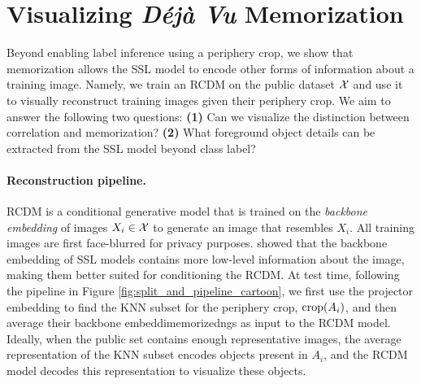 \section{Visualizing \emph{Déjà Vu} Memorization}
\label{sec:visualizing}
Beyond enabling label inference using a periphery crop, we show that \dejavu memorization allows the SSL model to encode other forms of information about a training image. Namely, we train an RCDM \citep{RCDM} on the public dataset $\mathcal{X}$ and use it to visually reconstruct training images given their periphery crop.
We aim to answer the following two questions: \textbf{(1)} Can we visualize the distinction between correlation and \dejavu memorization? \textbf{(2)} What foreground object details can be extracted from the SSL model beyond class label? 
\vspace{-0.5em}
\paragraph{Reconstruction pipeline.}
RCDM is a conditional generative model that is trained on the \emph{backbone embedding} of images $X_i \in \mathcal{X}$ to generate an image that resembles $X_i$. All training images are first face-blurred for privacy purposes. \citet{RCDM} showed that the backbone embedding of SSL models contains more low-level information about the image, making them better suited for conditioning the RCDM.
At test time, following the pipeline in Figure \ref{fig:split_and_pipeline_cartoon}, we first use the projector embedding to find the KNN subset for the periphery crop, $\mathrm{crop}({A_i})$, and then average their backbone embeddimemorizedngs as input to the RCDM model. Ideally, when the public set contains enough representative images, the average representation of the KNN subset encodes objects present in $A_i$, and the RCDM model decodes this representation to visualize these objects.
% 
%



